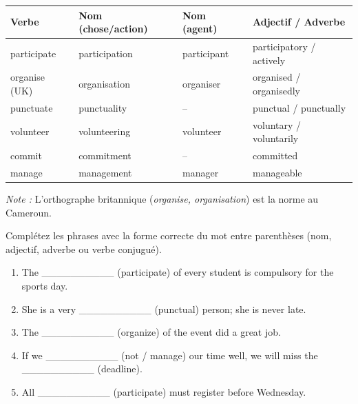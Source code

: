 \documentclass[11pt]{article}
\newcommand{\cle}[1]{{\popxbold\color{popdark}#1}}
\newcounter{popsec}
\newcounter{popsub}
\newcommand{\courssub}[1]{%
  \stepcounter{popsub}%
  \par\vspace{9pt}\noindent{\popxbold\fontsize{11.5}{13}\selectfont\color{popink}{\color{poporange}\thepopsec.\thepopsub}\hspace{6pt}#1}\par\nopagebreak\vspace{4pt}
}
\begin{document}
\begin{aretenir}
\begin{center}
\begin{tabular}{|l|l|l|l|}
\hline
\rowcolor{popgreenL} \textbf{Verbe} & \textbf{Nom (chose/action)} & \textbf{Nom (agent)} & \textbf{Adjectif / Adverbe} \\
\hline
\cle{participate} & \cle{participation} & \cle{participant} & \cle{participatory} / \cle{actively} \\
\cle{organise} (UK) & \cle{organisation} & \cle{organiser} & \cle{organised} / \cle{organisedly} \\
\cle{punctuate} & \cle{punctuality} & -- & \cle{punctual} / \cle{punctually} \\
\cle{volunteer} & \cle{volunteering} & \cle{volunteer} & \cle{voluntary} / \cle{voluntarily} \\
\cle{commit} & \cle{commitment} & -- & \cle{committed} \\
\cle{manage} & \cle{management} & \cle{manager} & \cle{manageable} \\
\hline
\end{tabular}
\end{center}
\emph{Note :} L'orthographe britannique (\textit{organise, organisation}) est la norme au Cameroun.
\end{aretenir}

\begin{exercice}
Complétez les phrases avec la forme correcte du mot entre parenthèses (nom, adjectif, adverbe ou verbe conjugué).
\begin{enumerate}
\item The \_\_\_\_\_\_\_\_\_\_ (participate) of every student is compulsory for the sports day.
\item She is a very \_\_\_\_\_\_\_\_\_\_ (punctual) person; she is never late.
\item The \_\_\_\_\_\_\_\_\_\_ (organize) of the event did a great job.
\item If we \_\_\_\_\_\_\_\_\_\_ (not / manage) our time well, we will miss the \_\_\_\_\_\_\_\_\_\_ (deadline).
\item All \_\_\_\_\_\_\_\_\_\_ (participate) must register before Wednesday.
\end{enumerate}
\end{exercice}

\courssub{Je m'entraîne}
\end{document}
